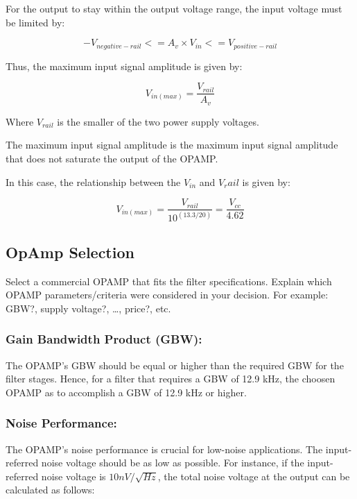 For the output to stay within the output voltage range, the input voltage must be limited by:

\begin{equation}
    -V_{negative-rail} <= A_v \times V_{in} <= V_{positive-rail}
\end{equation}

Thus, the maximum input signal amplitude is given by:

\begin{equation}
    V_{in(max)} = \frac{V_{rail}}{A_v}
\end{equation}

Where $V_{rail}$ is the smaller of the two power supply voltages.

The maximum input signal amplitude is the maximum input signal amplitude that does not saturate the output of the OPAMP.

In this case, the relationship between the $V_{in}$ and $V_rail$ is given by:

\begin{equation}
    V_{in(max)} = \frac{V_{rail}}{10^{(13.3/20)}} = \frac{V_{cc}}{4.62}
\end{equation}

\subsection{OpAmp Selection}
Select a commercial OPAMP that fits the filter specifications. Explain which OPAMP
parameters/criteria were considered in your decision. For example: GBW?, supply voltage?, …,
price?, etc.


\subsubsection{Gain Bandwidth Product (GBW):}

The OPAMP's GBW should be equal or higher than the required GBW for the filter stages. Hence, for a filter that requires a GBW of 12.9 kHz, the choosen OPAMP as to accomplish a GBW of 12.9 kHz or higher.

\subsubsection{Noise Performance:}

The OPAMP's noise performance is crucial for low-noise applications. The input-referred noise voltage should be as low as possible. For instance, if the input-referred noise voltage is $10 nV/\sqrt{Hz}$, the total noise voltage at the output can be calculated as follows:

